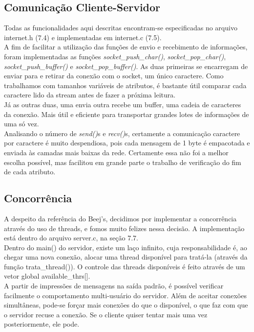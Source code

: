 \documentclass[11pt,twoside]{article}
\begin{document}
\subsection{Comunicação Cliente-Servidor}
Todas as funcionalidades aqui descritas encontram-se especificadas no arquivo internet.h (7.4) e implementadas em internet.c (7.5).\\
A fim de facilitar a utilização das funções de envio e recebimento de informações, foram implementadas as funções \textit{socket\_push\_char()}, \textit{socket\_pop\_char()}, \textit{socket\_push\_buffer()} e \textit{socket\_pop\_buffer()}. As duas primeiras se encarregam de enviar para e retirar da conexão com o socket, um único caractere. Como trabalhamos com tamanhos variáveis de atributos, é bastante útil comparar cada caractere lido da stream antes de fazer a próxima leitura.\\
Já as outras duas, uma envia outra recebe um buffer, uma cadeia de caracteres da conexão. Mais útil e eficiente para transportar grandes lotes de informações de uma só vez.\\
Analisando o número de \textit{send()}s e \textit{recv()}s, certamente a comunicação caractere por caractere é muito despendiosa, pois cada mensagem de 1 byte é empacotada e enviada às camadas mais baixas da rede. Certamente essa não foi a melhor escolha possível, mas facilitou em grande parte o trabalho de verificação do fim de cada atributo.

\subsection{Concorrência}
A despeito da referência do Beej's, decidimos por implementar a concorrência através do uso de threads, e fomos muito felizes nessa decisão. A implementação está dentro do arquivo server.c, na seção 7.7.\\
Dentro do main() do servidor, existe um laço infinito, cuja responsabilidade é, ao chegar uma nova conexão, alocar uma thread disponível para tratá-la (através da função trata\_thread()). O controle das threads disponíveis é feito através de um vetor global available\_thrs[].\\
A partir de impressões de mensagens na saída padrão, é possível verificar facilmente o comportamento multi-usuário do servidor. Além de aceitar conexões simultâneas, pode-se forçar mais conexões do que o disponível, o que faz com que o servidor recuse a conexão. Se o cliente quiser tentar mais uma vez posteriormente, ele pode.
\end{document}
